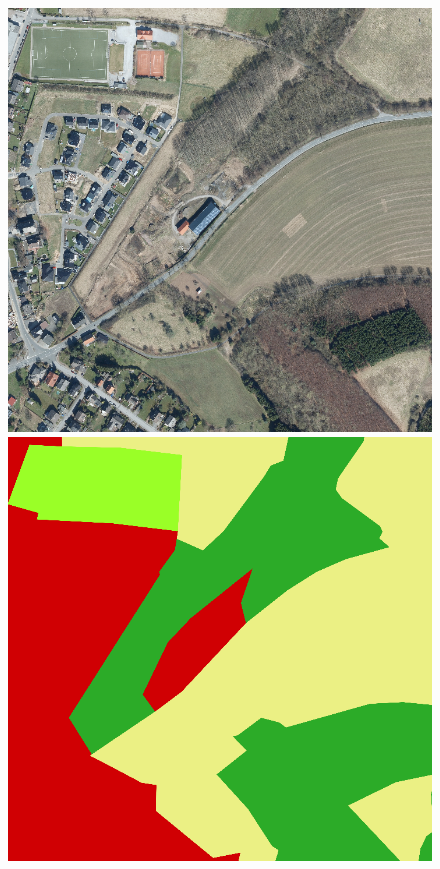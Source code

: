 \begin{figure}
    \vspace{2mm}
    \includegraphics[width=\DiscussionImageWidth]{images/segmentation_discussion/images/2.png} \hfill
    \includegraphics[width=\DiscussionImageWidth]{images/segmentation_discussion/labels/2.png} \hfill

\end{figure}
